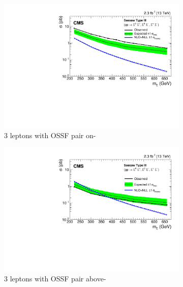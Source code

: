 \begin{figure}
\begin{center}
	\begin{subfigure}[b]{.5\textwidth}
		\includegraphics[width=\textwidth]{Results/exclusion-L3DYz1}
		\caption{3 leptons with OSSF pair on-\Z} \label{fig:exclusions/a}
	\end{subfigure}%
	\begin{subfigure}[b]{.5\textwidth}
		\includegraphics[width=\textwidth]{Results/exclusion-L3DYh1}
		\caption{3 leptons with OSSF pair above-\Z}
	\end{subfigure}
	\begin{subfigure}[b]{.5\textwidth}

\end{subfigure}
\end{center}
\end{figure}
